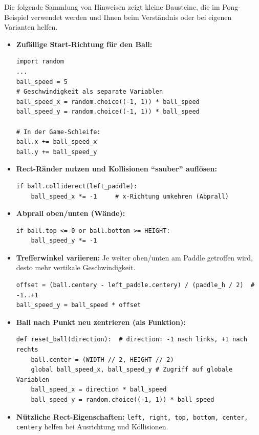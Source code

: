 \begin{myattention}
    Die folgende Sammlung von Hinweisen zeigt kleine Bausteine, die im Pong-Beispiel verwendet werden und Ihnen beim Verständnis oder bei eigenen Varianten helfen.

    \begin{itemize}

        \item \textbf{Zufällige Start-Richtung für den Ball:}
              \begin{lstlisting}
import random
...
ball_speed = 5
# Geschwindigkeit als separate Variablen
ball_speed_x = random.choice((-1, 1)) * ball_speed
ball_speed_y = random.choice((-1, 1)) * ball_speed

# In der Game-Schleife:
ball.x += ball_speed_x
ball.y += ball_speed_y
\end{lstlisting}

        \item \textbf{Rect-Ränder nutzen und Kollisionen \enquote{sauber} auflösen:}
              \begin{lstlisting}
if ball.colliderect(left_paddle):
    ball_speed_x *= -1     # x-Richtung umkehren (Abprall)
\end{lstlisting}

        \item \textbf{Abprall oben/unten (Wände):}
              \begin{lstlisting}
if ball.top <= 0 or ball.bottom >= HEIGHT:
    ball_speed_y *= -1
\end{lstlisting}

        \item \textbf{Trefferwinkel variieren:} Je weiter oben/unten am Paddle getroffen wird, desto mehr vertikale Geschwindigkeit.
              \begin{lstlisting}
offset = (ball.centery - left_paddle.centery) / (paddle_h / 2)  # -1..+1
ball_speed_y = ball_speed * offset
\end{lstlisting}

        \item \textbf{Ball nach Punkt neu zentrieren (als Funktion):}
              \begin{lstlisting}
def reset_ball(direction):  # direction: -1 nach links, +1 nach rechts
    ball.center = (WIDTH // 2, HEIGHT // 2)
    global ball_speed_x, ball_speed_y # Zugriff auf globale Variablen
    ball_speed_x = direction * ball_speed
    ball_speed_y = random.choice((-1, 1)) * ball_speed
\end{lstlisting}

        \item \textbf{Nützliche Rect-Eigenschaften:} \lstinline|left, right, top, bottom, center, centery| helfen bei Ausrichtung und Kollisionen.
    \end{itemize}
\end{myattention}

